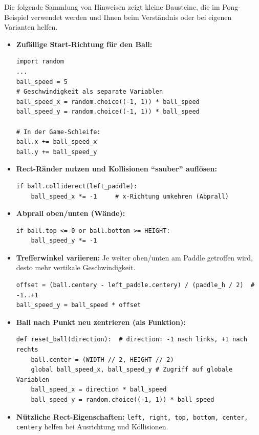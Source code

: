 \begin{myattention}
    Die folgende Sammlung von Hinweisen zeigt kleine Bausteine, die im Pong-Beispiel verwendet werden und Ihnen beim Verständnis oder bei eigenen Varianten helfen.

    \begin{itemize}

        \item \textbf{Zufällige Start-Richtung für den Ball:}
              \begin{lstlisting}
import random
...
ball_speed = 5
# Geschwindigkeit als separate Variablen
ball_speed_x = random.choice((-1, 1)) * ball_speed
ball_speed_y = random.choice((-1, 1)) * ball_speed

# In der Game-Schleife:
ball.x += ball_speed_x
ball.y += ball_speed_y
\end{lstlisting}

        \item \textbf{Rect-Ränder nutzen und Kollisionen \enquote{sauber} auflösen:}
              \begin{lstlisting}
if ball.colliderect(left_paddle):
    ball_speed_x *= -1     # x-Richtung umkehren (Abprall)
\end{lstlisting}

        \item \textbf{Abprall oben/unten (Wände):}
              \begin{lstlisting}
if ball.top <= 0 or ball.bottom >= HEIGHT:
    ball_speed_y *= -1
\end{lstlisting}

        \item \textbf{Trefferwinkel variieren:} Je weiter oben/unten am Paddle getroffen wird, desto mehr vertikale Geschwindigkeit.
              \begin{lstlisting}
offset = (ball.centery - left_paddle.centery) / (paddle_h / 2)  # -1..+1
ball_speed_y = ball_speed * offset
\end{lstlisting}

        \item \textbf{Ball nach Punkt neu zentrieren (als Funktion):}
              \begin{lstlisting}
def reset_ball(direction):  # direction: -1 nach links, +1 nach rechts
    ball.center = (WIDTH // 2, HEIGHT // 2)
    global ball_speed_x, ball_speed_y # Zugriff auf globale Variablen
    ball_speed_x = direction * ball_speed
    ball_speed_y = random.choice((-1, 1)) * ball_speed
\end{lstlisting}

        \item \textbf{Nützliche Rect-Eigenschaften:} \lstinline|left, right, top, bottom, center, centery| helfen bei Ausrichtung und Kollisionen.
    \end{itemize}
\end{myattention}

